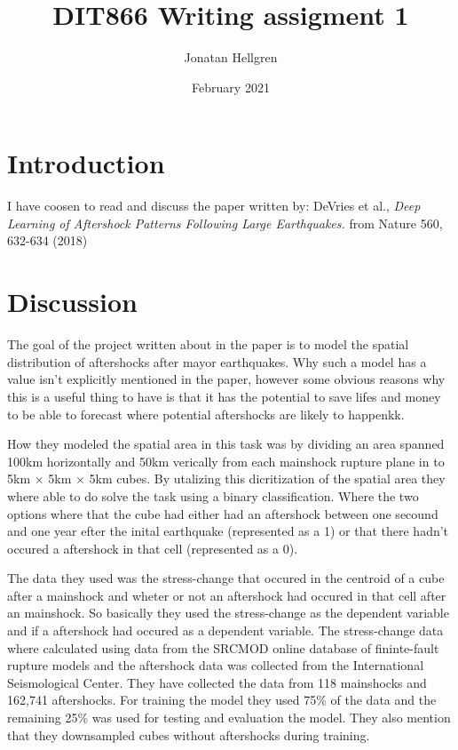 \documentclass{article}
\title{DIT866 Writing assigment 1}
\author{Jonatan Hellgren }
\date{February 2021}
\begin{document}
\maketitle

\section{Introduction}
I have coosen to read and discuss the paper written by: DeVries et al.,
\textit{Deep Learning of Aftershock Patterns Following Large Earthquakes.} from
Nature 560, 632-634 (2018)

\section{Discussion}
The goal of the project written about in the paper is to model the spatial
distribution of aftershocks after mayor earthquakes. Why such a model has a
value isn't explicitly mentioned in the paper, however some obvious reasons why
this is a useful thing to have is that it has the potential to save lifes and
money to be able to forecast where potential aftershocks are likely to happenkk.

How they modeled the spatial area in this task 
was by dividing an area spanned 100km horizontally and 50km
verically from each mainshock rupture plane in to 5km $\times$ 5km $\times$ 
5km cubes. By utalizing this dicritization of the spatial area they where able
to do solve the task using a binary classification. Where the two options where
that the cube had either had an aftershock between one secound and one year
efter the inital earthquake (represented as a 1) or that there hadn't occured a
aftershock in that cell (represented as a 0). 

The data they used was the stress-change that occured in the centroid of a cube
after a mainshock and wheter or not an aftershock had occured in that cell after
an mainshock. So basically they used the stress-change as the dependent variable
and if a aftershock had occured as a dependent variable. The stress-change data
where calculated using data from the SRCMOD online database of fininte-fault 
rupture models and the aftershock data was collected from the International 
Seismological Center. They have collected the data from 118 mainshocks and
162,741 aftershocks.  For training the model they used 75\% of the data and the 
remaining 25\% was used for testing and evaluation the model. They also mention
that they downsampled cubes without aftershocks during training.
\end{document}
